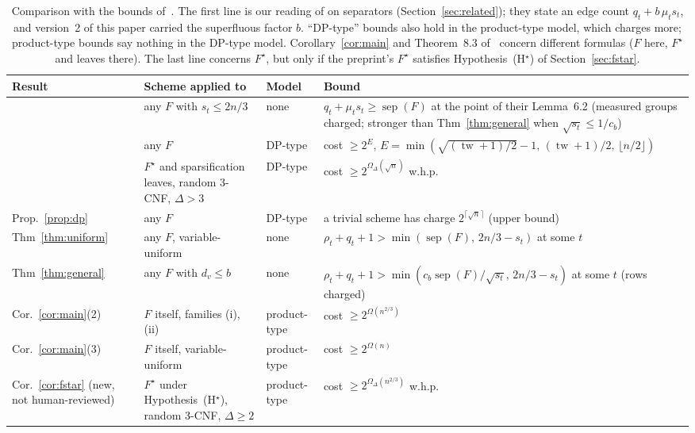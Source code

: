 \documentclass[11pt,a4paper]{article}
\theoremstyle{definition}
\theoremstyle{remark}
\newcommand{\sep}{\operatorname{sep}}
\newcommand{\tw}{\operatorname{tw}}
\begin{document}
\begin{table}[t]
\centering
\small
\begin{tabular}{@{}>{\raggedright\arraybackslash}p{2.5cm}>{\raggedright\arraybackslash}p{3.7cm}>{\raggedright\arraybackslash}p{2.1cm}>{\raggedright\arraybackslash}p{6.2cm}@{}}
\toprule
Result & Scheme applied to & Model & Bound\\
\midrule
\cite[Thm~7.1(ii)]{DL} & any $F$ with $s_t\le 2n/3$ & none & $q_t+\mu_ts_t\ge\sep(F)$ at the point of their Lemma~6.2 \newline(measured groups charged; stronger than Thm~\ref{thm:general} when $\sqrt{s_t}\le1/c_b$)\\[2pt]
\cite[Thm~8.1]{DL} & any $F$ & DP-type & cost $\ge2^{E}$, \newline $E=\min(\sqrt{(\tw+1)/2}-1,\,(\tw+1)/2,\,\lfloor n/2\rfloor)$\\[2pt]
\cite[Thm~8.3]{DL} & $F^\star$ and sparsification leaves, random 3-CNF, $\Delta>3$ & DP-type & cost $\ge2^{\Omega_\Delta(\sqrt n)}$ w.h.p.\\[2pt]
Prop.~\ref{prop:dp} & any $F$ & DP-type & a trivial scheme has charge $2^{\lceil\sqrt n\rceil}$ (upper bound)\\[2pt]
Thm~\ref{thm:uniform} & any $F$, variable-uniform & none & $\rho_t+q_t+1>\min(\sep(F),\,2n/3-s_t)$ \newline at some $t$\\[2pt]
Thm~\ref{thm:general} & any $F$ with $d_v\le b$ & none & $\rho_t+q_t+1>\min(c_b\sep(F)/\sqrt{s_t},\,2n/3-s_t)$ \newline at some $t$ (rows charged)\\[2pt]
Cor.~\ref{cor:main}(2) & $F$ itself, families (i), (ii) & product-type & cost $\ge2^{\Omega(n^{2/3})}$\\[2pt]
Cor.~\ref{cor:main}(3) & $F$ itself, variable-uniform & product-type & cost $\ge2^{\Omega(n)}$\\[2pt]
Cor.~\ref{cor:fstar} \newline(new, not human-reviewed) & $F^\star$ under Hypothesis~(H$^\star$), random 3-CNF, $\Delta\ge2$ & product-type & cost $\ge2^{\Omega_\Delta(n^{2/3})}$ w.h.p.\\
\bottomrule
\end{tabular}
\caption{Comparison with the bounds of~\cite{DL}. The first line is our reading of
\cite[Thm~7.1(ii)]{DL} on separators (Section~\ref{sec:related}); they state an edge count
$q_t+b\,\mu_ts_t$, and version~2 of this paper carried the superfluous factor $b$.
``DP-type'' bounds also hold in the product-type model, which charges more; product-type
bounds say nothing in the DP-type model. Corollary~\ref{cor:main} and Theorem~8.3
of~\cite{DL} concern different formulas ($F$ here, $F^\star$ and leaves there). The last
line concerns $F^\star$, but only if the preprint's $F^\star$ satisfies
Hypothesis~(H$^\star$) of Section~\ref{sec:fstar}.}\label{tab:compare}
\end{table}
\end{document}
